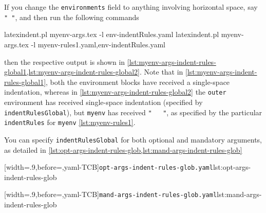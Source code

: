  If you change the \texttt{environments} field to anything involving horizontal space, say
 \lstinline!" "!, and then run the following commands 

 \begin{commandshell}
latexindent.pl myenv-args.tex -l env-indentRules.yaml
latexindent.pl myenv-args.tex -l myenv-rules1.yaml,env-indentRules.yaml
\end{commandshell}
 then the respective output is shown in
 \cref{lst:myenv-args-indent-rules-global1,lst:myenv-args-indent-rules-global2}. Note that
 in \cref{lst:myenv-args-indent-rules-global1}, both the environment blocks have received
 a single-space indentation, whereas in \cref{lst:myenv-args-indent-rules-global2} the
 \texttt{outer} environment has received single-space indentation (specified by
 \texttt{indentRulesGlobal}), but \texttt{myenv} has received \lstinline!"   "!, as
 specified by the particular \texttt{indentRules} for \texttt{myenv}
 \vref{lst:myenv-rules1}.

 \begin{minipage}{.45\textwidth}
 \end{minipage}
 \hfill
 \begin{minipage}{.45\textwidth}
 \end{minipage}

 You can specify \texttt{indentRulesGlobal} for both optional and mandatory arguments, as
 detailed in \cref{lst:opt-args-indent-rules-glob,lst:mand-args-indent-rules-glob}

 \begin{minipage}{.49\textwidth}
  [width=.9\linewidth,before=\centering,yaml-TCB]{\texttt{opt-args-indent-rules-glob.yaml}}{lst:opt-args-indent-rules-glob}
 \end{minipage}
 \hfill
 \begin{minipage}{.49\textwidth}
  [width=.9\linewidth,before=\centering,yaml-TCB]{\texttt{mand-args-indent-rules-glob.yaml}}{lst:mand-args-indent-rules-glob}
 \end{minipage}

